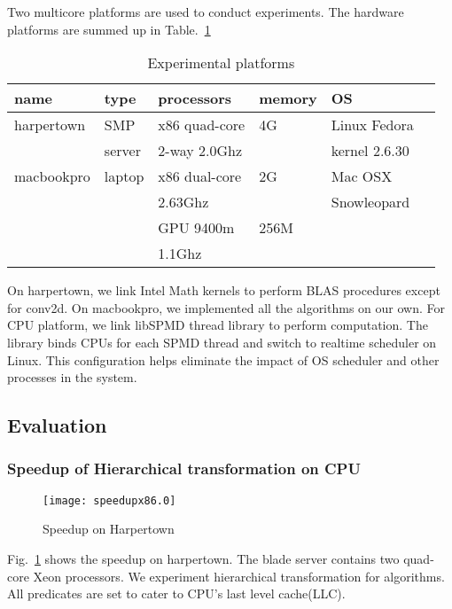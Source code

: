 Two multicore platforms are used to conduct experiments. The hardware
platforms are summed up in Table.~\ref{tbl:mach}

\begin{table}[hbt]
\caption{Experimental platforms}\label{tbl:mach}
\begin{center}
\begin{tabular}{|l|l|l|l|l|r|}
\hline
\textbf{name}&\textbf{type}&\textbf{processors}&\textbf{memory}&\textbf{OS}\\
\hline
harpertown&SMP &x86 quad-core  &4G&Linux Fedora\\
                  &  server &   
2-way  2.0Ghz & &kernel 2.6.30\\
\hline
macbookpro&laptop &x86 dual-core &2G&Mac OSX\\
                    &           & 2.63Ghz         &  &Snowleopard\\
                   &           &GPU 9400m    &256M & \\
                    &           & 1.1Ghz   & &\\
\hline
\end{tabular} 
\end{center}
\end{table}
On harpertown, we link Intel Math kernels to perform BLAS procedures
except for conv2d. On macbookpro, we implemented all the algorithms on
our own. For CPU platform, we link libSPMD thread library to
perform computation. The library binds CPUs for each SPMD
thread and switch to realtime scheduler on Linux.  This configuration
helps eliminate the impact of OS scheduler and other processes in the
system.

\subsection{Evaluation}
\subsubsection{Speedup of Hierarchical transformation on CPU}
\begin{figure}
\texttt{[image: speedupx86.0]}
\caption{Speedup on Harpertown}\label{fig:spdx86}
\end{figure}

Fig.~\ref{fig:spdx86} shows the speedup on harpertown. The blade
server contains two quad-core Xeon
processors. We experiment hierarchical transformation for
algorithms. All predicates are set to cater to CPU's last level cache(LLC).

